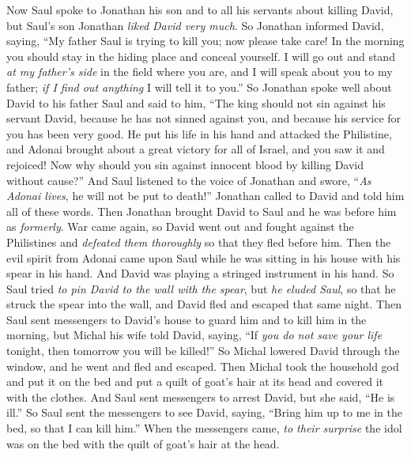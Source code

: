 \begin{biblechapter} %
 Now Saul spoke to Jonathan his son and to all his servants about killing David, but Saul’s son Jonathan \textit{liked David very much}.
\verse So Jonathan informed David, saying, “My father Saul is trying to kill you; now please take care! In the morning you should stay in the hiding place and conceal yourself.
\verse I will go out and stand \textit{at my father’s side} in the field where you are, and I will speak about you to my father; \textit{if I find out anything} I will tell it to you.”
\verse So Jonathan spoke well about David to his father Saul and said to him, “The king should not sin against his servant David, because he has not sinned against you, and because his service for you has been very good.
\verse He put his life in his hand and attacked the Philistine, and Adonai brought about a great victory for all of Israel, and you saw it and rejoiced! Now why should you sin against innocent blood by killing David without cause?”
\verse And Saul listened to the voice of Jonathan and swore, “\textit{As Adonai lives}, he will not be put to death!”
\verse Jonathan called to David and told him all of these words. Then Jonathan brought David to Saul and he was before him as \textit{formerly}.
 War came again, so David went out and fought against the Philistines and \textit{defeated them thoroughly} so that they fled before him.
\verse Then the evil spirit from Adonai came upon Saul while he was sitting in his house with his spear in his hand. And David was playing a stringed instrument in his hand.
\verse So Saul tried \textit{to pin David to the wall with the spear}, but \textit{he eluded Saul}, so that he struck the spear into the wall, and David fled and escaped that same night.
\verse Then Saul sent messengers to David’s house to guard him and to kill him in the morning, but Michal his wife told David, saying, “If \textit{you do not save your life} tonight, then tomorrow you will be killed!”
\verse So Michal lowered David through the window, and he went and fled and escaped.
\verse Then Michal took the household god and put it on the bed and put a quilt of goat’s hair at its head and covered it with the clothes.
\verse And Saul sent messengers to arrest David, but she said, “He is ill.”
\verse So Saul sent the messengers to see David, saying, “Bring him up to me in the bed, so that I can kill him.”
\verse When the messengers came, \textit{to their surprise} the idol was on the bed with the quilt of goat’s hair at the head.

\end{biblechapter}
